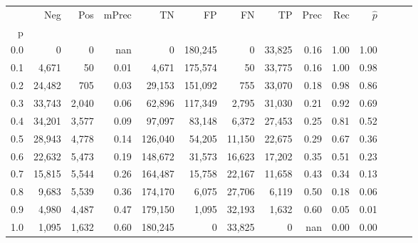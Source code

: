 \begin{tabular}{rrrrrrrrrrrrrr}
\toprule
{} &     Neg &    Pos & mPrec &       TN &       FP &      FN &      TP &  Prec &   Rec & $\hat{p}$ \\
p   &         &        &       &          &          &         &         &       &       &           \\
\midrule
0.0 &       0 &      0 &   nan &        0 &  180,245 &       0 &  33,825 &  0.16 &  1.00 &      1.00 \\
0.1 &   4,671 &     50 &  0.01 &    4,671 &  175,574 &      50 &  33,775 &  0.16 &  1.00 &      0.98 \\
0.2 &  24,482 &    705 &  0.03 &   29,153 &  151,092 &     755 &  33,070 &  0.18 &  0.98 &      0.86 \\
0.3 &  33,743 &  2,040 &  0.06 &   62,896 &  117,349 &   2,795 &  31,030 &  0.21 &  0.92 &      0.69 \\
0.4 &  34,201 &  3,577 &  0.09 &   97,097 &   83,148 &   6,372 &  27,453 &  0.25 &  0.81 &      0.52 \\
0.5 &  28,943 &  4,778 &  0.14 &  126,040 &   54,205 &  11,150 &  22,675 &  0.29 &  0.67 &      0.36 \\
0.6 &  22,632 &  5,473 &  0.19 &  148,672 &   31,573 &  16,623 &  17,202 &  0.35 &  0.51 &      0.23 \\
0.7 &  15,815 &  5,544 &  0.26 &  164,487 &   15,758 &  22,167 &  11,658 &  0.43 &  0.34 &      0.13 \\
0.8 &   9,683 &  5,539 &  0.36 &  174,170 &    6,075 &  27,706 &   6,119 &  0.50 &  0.18 &      0.06 \\
0.9 &   4,980 &  4,487 &  0.47 &  179,150 &    1,095 &  32,193 &   1,632 &  0.60 &  0.05 &      0.01 \\
1.0 &   1,095 &  1,632 &  0.60 &  180,245 &        0 &  33,825 &       0 &   nan &  0.00 &      0.00 \\
\bottomrule
\end{tabular}
